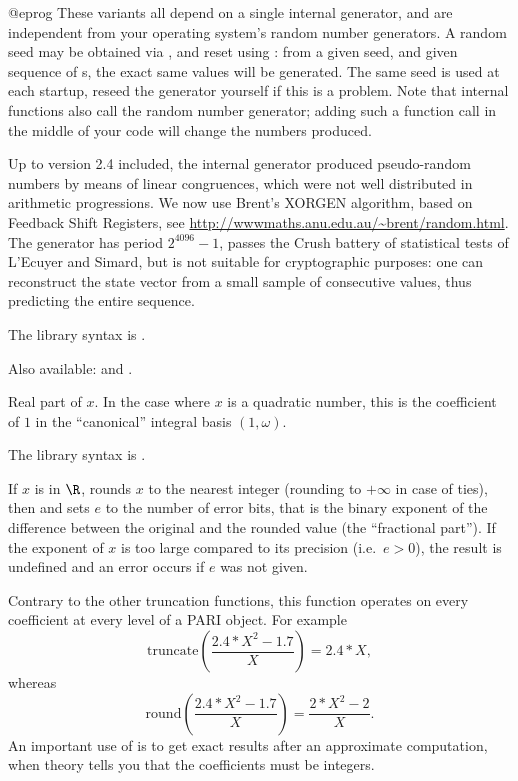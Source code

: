 @eprog
These variants all depend on a single internal generator, and are
independent from your operating system's random number generators.
A random seed may be obtained via , and reset
using : from a given seed, and given sequence of s,
the exact same values will be generated. The same seed is used at each
startup, reseed the generator yourself if this is a problem. Note that
internal functions also call the random number generator; adding such a
function call in the middle of your code will change the numbers produced.

Up to
version 2.4 included, the internal generator produced pseudo-random numbers
by means of linear congruences, which were not well distributed in arithmetic
progressions. We now
use Brent's XORGEN algorithm, based on Feedback Shift Registers, see
\url{http://wwwmaths.anu.edu.au/~brent/random.html}. The generator has period
$2^{4096}-1$, passes the Crush battery of statistical tests of L'Ecuyer and
Simard, but is not suitable for cryptographic purposes: one can reconstruct
the state vector from a small sample of consecutive values, thus predicting
the entire sequence.

The library syntax is .

 Also available:  and .

\label{se:real}
Real part of $x$. In the case where $x$ is a quadratic number, this is the
coefficient of $1$ in the ``canonical'' integral basis $(1,\omega)$.

The library syntax is .

\label{se:round}
If $x$ is in $\R$, rounds $x$ to the nearest integer (rounding to
$+\infty$ in case of ties), then and sets $e$ to the number of error bits,
that is the binary exponent of the difference between the original and the
rounded value (the ``fractional part''). If the exponent of $x$ is too large
compared to its precision (i.e.~$e>0$), the result is undefined and an error
occurs if $e$ was not given.

 Contrary to the other truncation functions,
this function operates on every coefficient at every level of a PARI object.
For example
$$\text{truncate}\left(\dfrac{2.4*X^2-1.7}{X}\right)=2.4*X,$$
whereas
$$\text{round}\left(\dfrac{2.4*X^2-1.7}{X}\right)=\dfrac{2*X^2-2}{X}.$$
An important use of  is to get exact results after an approximate
computation, when theory tells you that the coefficients must be integers.

